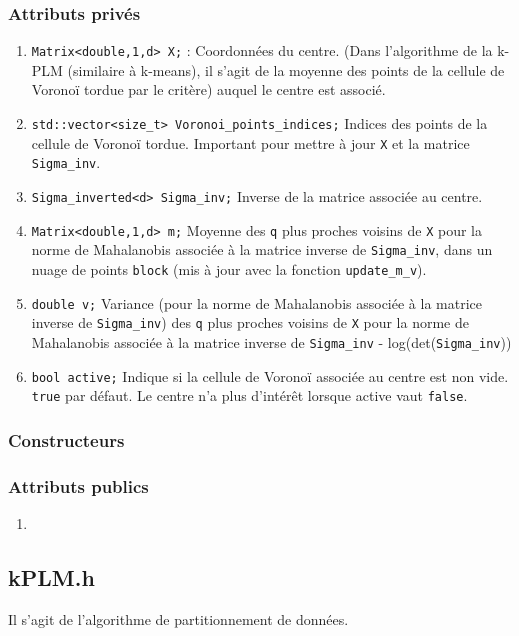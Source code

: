 \documentclass[10pt,a4paper,notitlepage]{article}
\begin{document}
\subsubsection{Attributs privés}
\begin{enumerate}
\item \texttt{Matrix<double,1,d> X;} : Coordonnées du centre. (Dans l'algorithme de la k-PLM (similaire à k-means), il s'agit de la moyenne des points de la cellule de Voronoï tordue par le critère) auquel le centre est associé.
\item \texttt{std::vector<size\_t> Voronoi\_points\_indices;} Indices des points de la cellule de Voronoï tordue. Important pour mettre à jour \texttt{X} et la matrice \texttt{Sigma\_inv}.
\item \texttt{Sigma\_inverted<d> Sigma\_inv;} Inverse de la matrice associée au centre.
\item \texttt{Matrix<double,1,d> m;} Moyenne des \texttt{q} plus proches voisins de \texttt{X} pour la norme de Mahalanobis associée à la matrice inverse de \texttt{Sigma\_inv}, dans un nuage de points \texttt{block} (mis à jour avec la fonction \texttt{update\_m\_v}).
\item \texttt{double v;} Variance (pour la norme de Mahalanobis associée à la matrice inverse de \texttt{Sigma\_inv}) des \texttt{q} plus proches voisins de \texttt{X} pour la norme de Mahalanobis associée à la matrice inverse de \texttt{Sigma\_inv} - log(det(\texttt{Sigma\_inv}))
\item \texttt{bool active;} Indique si la cellule de Voronoï associée au centre est non vide. \texttt{true} par défaut. Le centre n'a plus d'intérêt lorsque active vaut \texttt{false}.
\end{enumerate}
\subsubsection{Constructeurs}
\subsubsection{Attributs publics}
\begin{enumerate}
\item
\end{enumerate}

\subsection{kPLM.h}

Il s'agit de l'algorithme de partitionnement de données.
\end{document}
